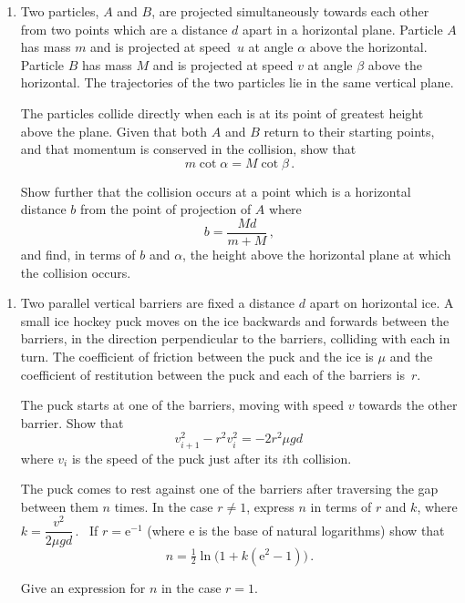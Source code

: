 \documentclass[a4, 11pt]{report}
\newlength{\qspace}
\newcounter{qnumber}
\newenvironment{question}%
 {\vspace{\qspace}
  \begin{enumerate}[\bfseries 1\quad][10]%
    \setcounter{enumi}{\value{qnumber}}%
    \item%
 }
{
  \end{enumerate}
  \filbreak
  \stepcounter{qnumber}
 }
\def\e{{\mathrm e}}
\begin{document}
	
\begin{question}
Two particles, $A$  and $B$, are 
projected simultaneously towards each other from two points 
which are a distance
$d$ apart in a   
horizontal plane.
Particle $A$ has mass $m$ and is projected
at speed~$u$ at angle $\alpha$ above the horizontal.  
Particle $B$ has mass $M$ and 
is projected at speed $v$ at angle $\beta$
above the horizontal. 
The trajectories of the two particles lie in the same  vertical 
plane.


The particles collide
directly when each is at its point of greatest height above the
plane. 
 Given that 
both  $A$ and $B$  return to their starting points, and that
momentum is conserved in the collision, show that
\[
m\cot \alpha = M \cot \beta\,.
\]

Show further that the collision occurs at a point which is a 
horizontal distance  $b$ 
from the point
of projection of $A$ 
where
\[
b= \frac{Md}{m+M}\, ,
\]
and find, 
in terms of $b$ and $\alpha$, 
the height above the horizontal plane at which the collision occurs.
	\end{question}
	
\begin{question}	
Two parallel vertical barriers are fixed a distance $d$ apart on 
horizontal ice. 
A small ice hockey puck moves on the ice backwards and forwards
between the barriers, 
in the direction perpendicular
to the barriers,
colliding with 
each in turn.
The coefficient of friction 
between the puck and the ice is $\mu$ and the coefficient
of restitution between the puck and each of the barriers is~$r$. 


The puck starts at one of the barriers,  moving with speed
$v$ towards the other barrier. 
Show that
\[
v_{i+1}^2 - r^2 v_i^2 = - 2 r^2 \mu gd\,
\]
where $v_i$ is the speed of the puck just after its $i$th collision.



The puck comes to rest against one of the barriers
after traversing the gap between them $n$ times.
In the case $r\ne1$, express $n$ in terms of 
$r$ and $k$, where 
$k= \dfrac{v^2}{2\mu g d}\,$. \ 
If $r=\e^{-1}$ (where $\e$ is the base of natural logarithms) 
show that
\[
n = \tfrac12 \ln\big(1+k(\e^2-1)\big)\,.
\]

Give an expression for $n$ in the case $r=1$.
\end{question}

\end{document}
